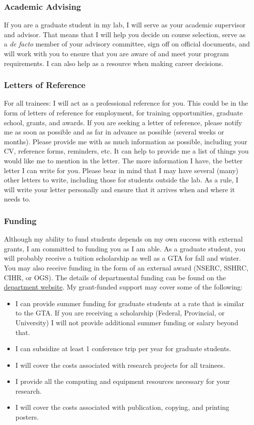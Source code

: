 \documentclass{article}
\begin{document}
\subsubsection{Academic Advising} If you are a graduate student in my lab, I will serve as your academic supervisor and advisor. That means that I will help you decide on course selection, serve as a \textit{de facto} member of your advisory committee, sign off on official documents, and will work with you to ensure that you are aware of and meet your program requirements. I can also help as a resource when making career decisions. 

\subsubsection {Letters of Reference} For all trainees: I will act as a professional reference for you. This could be in the form of letters of reference for employment, for training opportunities, graduate school, grants, and awards. If you are seeking a letter of reference, please notify me as soon as possible and as far in advance as possible (several weeks or months). Please provide me with as much information as possible, including your CV, reference forms, reminders, etc. It can help to provide me a list of things you would like me to mention in the letter. The more information I have, the better letter I can write for you. Please bear in mind that I may have several (many) other letters to write, including those for students outside the lab. As a rule, I will write your letter personally and ensure that it arrives when and where it needs to.

\subsubsection{Funding} Although my ability to fund students depends on my own success with external grants, I am committed to funding you as I am able. As a graduate student, you will probably receive a tuition scholarship as well as a GTA for fall and winter. You may also receive funding in the form of an external award (NSERC, SSHRC, CIHR, or OGS). The details of departmental funding can be found on the \href{http://psychology.uwo.ca/graduate/index.html}{department website}. My grant-funded support may cover some of the following:

\begin{itemize}
\item I can provide summer funding for graduate students at a rate that is similar to the GTA. If you are receiving a scholarship (Federal, Provincial, or University) I will not provide additional summer funding or salary beyond that.
\item I can subsidize at least 1 conference trip per year for graduate students.
\item I will cover the costs associated with research projects for all trainees. 
\item I provide all the computing and equipment resources necessary for your research.
\item I will cover the costs associated with publication, copying, and printing posters.
\end{itemize}
\end{document}
